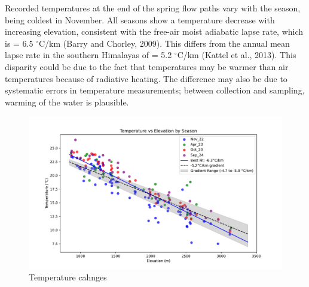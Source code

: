 \bsk

Recorded temperatures at the end of the spring flow paths vary with the season, being coldest in November. All seasons show a temperature decrease with increasing elevation, consistent with the free-air moist adiabatic lapse rate, which is = 6.5 $^{\circ}$C/km (Barry and Chorley, 2009). This differs from the annual mean lapse rate in the southern Himalayas of = 5.2 $^{\circ}$C/km (Kattel et al., 2013). This disparity could be due to the fact that temperatures may be warmer than air temperatures because of radiative heating. The difference may also be due to systematic errors in temperature measurements; between collection and sampling, warming of the water is plausible.



\begin{figure}[h]
    \centering
    \includegraphics[width=\textwidth]{Temperature_Elevation_Season.pdf}
    \caption{Temperature cahnges}
    \label{fig:seasonal_change2}
\end{figure}

\FloatBarrier









